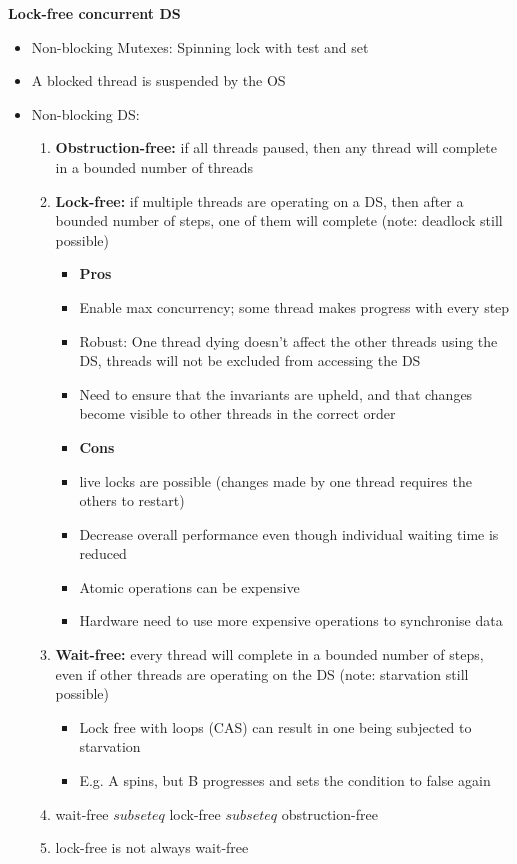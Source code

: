 \documentclass[10pt, landscape]{article}
\begin{document}
\begin{multicols}{4}
\textbf{Lock-free concurrent DS} \\
\begin{itemize}
    \item Non-blocking Mutexes: Spinning lock with test and set 
    \item A blocked thread is suspended by the OS
    \item Non-blocking DS: 
    \begin{enumerate}
        \item \textbf{Obstruction-free:} if all threads paused, then any thread will complete in a bounded number of threads
        \item \textbf{Lock-free:} if multiple threads are operating on a DS, then after a bounded number of steps, one of them will complete (note: deadlock  still possible)
        \begin{itemize}
            \item \textbf{Pros}
            \item Enable max concurrency; some thread makes progress with every step
            \item Robust: One thread dying doesn't affect the other threads using the DS, threads will not be excluded from accessing the DS 
            \item Need to ensure that the invariants are upheld, and that changes become visible to other threads in the correct order
            \item \textbf{Cons}
            \item live locks are possible (changes made by one thread requires the others to restart) 
            \item Decrease overall performance even though individual waiting time is reduced
            \item Atomic operations can be expensive
            \item Hardware need to use more expensive operations to synchronise data
        \end{itemize}
        \item \textbf{Wait-free:} every thread will complete in a bounded number of steps, even if other threads are operating on the DS (note: starvation still possible)
        \begin{itemize}
            \item Lock free with loops (CAS) can result in one being subjected to starvation 
            \item E.g. A spins, but B progresses and sets the condition to false again 
        \end{itemize}
        \item wait-free $subseteq$ lock-free $subseteq$ obstruction-free
        \item lock-free is not always wait-free
    \end{enumerate}
\end{itemize}


\end{multicols}
\end{document}
